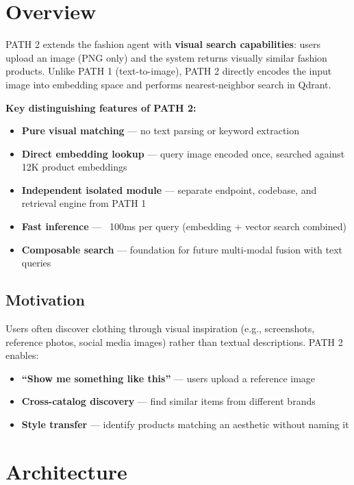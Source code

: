 \section{Overview}

PATH 2 extends the fashion agent with \textbf{visual search capabilities}: users upload an image (PNG only) and the system returns visually similar fashion products. Unlike PATH 1 (text-to-image), PATH 2 directly encodes the input image into embedding space and performs nearest-neighbor search in Qdrant.

\textbf{Key distinguishing features of PATH 2:}
\begin{itemize}
    \item \textbf{Pure visual matching} --- no text parsing or keyword extraction
    \item \textbf{Direct embedding lookup} --- query image encoded once, searched against 12K product embeddings
    \item \textbf{Independent isolated module} --- separate endpoint, codebase, and retrieval engine from PATH 1
    \item \textbf{Fast inference} --- ~100ms per query (embedding + vector search combined)
    \item \textbf{Composable search} --- foundation for future multi-modal fusion with text queries
\end{itemize}

\subsection{Motivation}

Users often discover clothing through visual inspiration (e.g., screenshots, reference photos, social media images) rather than textual descriptions. PATH 2 enables:
\begin{itemize}
    \item \textbf{``Show me something like this''} --- users upload a reference image
    \item \textbf{Cross-catalog discovery} --- find similar items from different brands
    \item \textbf{Style transfer} --- identify products matching an aesthetic without naming it
\end{itemize}

\section{Architecture}

